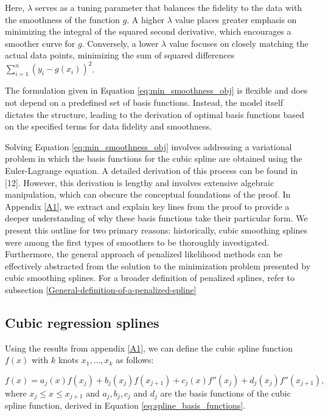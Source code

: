 \documentclass[
11pt, %
oneside, %
english, %
singlespacing, %
]{macthesis} %
\begin{document}
Here, \(\lambda\) serves as a tuning parameter that balances the fidelity to the data with the smoothness of the function \(g\). A higher \(\lambda\) value places greater emphasis on minimizing the integral of the squared second derivative, which encourages a smoother curve for \(g\). Conversely, a lower \(\lambda\) value focuses on closely matching the actual data points, minimizing the sum of squared differences \(\sum_{i=1}^n (y_i - g(x_i))^2\).

The formulation given in Equation \ref{eq:min_smoothness_obj} is flexible and does not depend on a predefined set of basis functions. Instead, the model itself dictates the structure, leading to the derivation of optimal basis functions based on the specified terms for data fidelity and smoothness.

Solving Equation \ref{eq:min_smoothness_obj} involves addressing a variational problem in which the basis functions for the cubic spline are obtained using the Euler-Lagrange equation. A detailed derivation of this process can be found in {[}12{]}. However, this derivation is lengthy and involves extensive algebraic manipulation, which can obscure the conceptual foundations of the proof. In Appendix \ref{A1}, we extract and explain key lines from the proof to provide a deeper understanding of why these basis functions take their particular form. We present this outline for two primary reasons: historically, cubic smoothing splines were among the first types of smoothers to be thoroughly investigated. Furthermore, the general approach of penalized likelihood methods can be effectively abstracted from the solution to the minimization problem presented by cubic smoothing splines. For a broader definition of penalized splines, refer to subsection \ref{General-definition-of-a-penalized-spline}

\subsection{Cubic regression splines}\label{Cubic-regression-splines}

Using the results from appendix \ref{A1}, we can define the cubic spline function \(f(x)\) with \(k\) knots \(x_1, \dots, x_k\) as follows:

\begin{equation}
f(x) = a_j(x)f(x_j) + b_j(x_j)f(x_{j+1}) + c_j(x)f''(x_j) + d_j(x_j)f''(x_{j+1}),
\label{eq:spline eqn}
\end{equation}
where \(x_j \leq x \leq x_{j+1}\) and \(a_j, b_j, c_j\) and \(d_j\) are the basis functions of the cubic spline function, derived in Equation \ref{eq:spline_basis_functions}.
\end{document}
